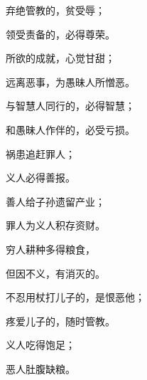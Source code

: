 {\par }{\Q {}弃绝管教的，{}贫受辱；
\par }{\Q 领受责备的，必得尊荣。
\par }{\Q {}所欲的成就，心觉甘甜；
\par }{\Q 远离恶事，为愚昧人所憎恶。
\par }{\Q {}与智慧人同行的，必得智慧；
\par }{\Q 和愚昧人作伴的，必受亏损。
\par }{\Q {}祸患追赶罪人；
\par }{\Q 义人必得善报。
\par }{\Q {}善人给子孙遗留产业；
\par }{\Q 罪人为义人积存资财。
\par }{\Q {}穷人耕种多得粮食，
\par }{\Q 但因不义，有消灭的。
\par }{\Q {}不忍用杖打儿子的，是恨恶他；
\par }{\Q 疼爱儿子的，随时管教。
\par }{\Q {}义人吃得饱足；
\par }{\Q 恶人肚腹缺粮。

}
